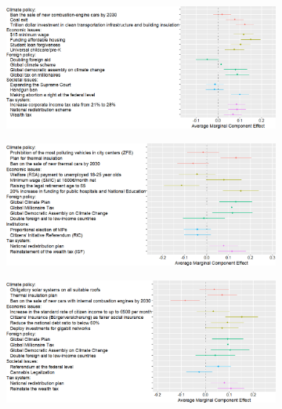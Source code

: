 \documentclass[12pt,english]{article}
\begin{document}
\begin{bibunit}
  \begin{figure}[h] 
    \cprotect\caption[Preferences for various policies in political platforms]{Effects of the presence of a policy (rather than none from this domain) in a random platform on the likelihood that it is preferred to another random platform. (See non-translated versions in Figure \ref{fig:ca_r_en}; \verb|[country]/ca_r|; Question \ref{q:conjoint_r}%
    )}\label{fig:ca_r}
    \begin{subfigure}{\textwidth}
      \includegraphics[width=\textwidth]{../figures/US1/ca_r.png}
    \end{subfigure}
    \begin{subfigure}{\textwidth}
      \includegraphics[width=\textwidth]{../figures/FR/ca_r_en.png}
    \end{subfigure}
  \end{figure}%
  \clearpage
  \begin{figure}[h!]\ContinuedFloat %
    \begin{subfigure}{\textwidth}
      \includegraphics[width=\textwidth]{../figures/DE/ca_r_en.png}

\end{subfigure}
\end{figure}
\end{bibunit}
\end{document}
